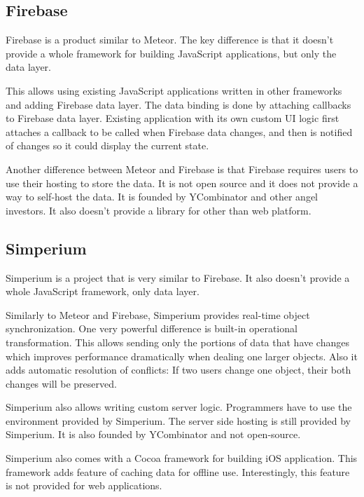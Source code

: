 \subsection{Firebase}

Firebase \citep{firebase} is a product similar to Meteor. The key difference is that it doesn't provide a whole framework for building JavaScript applications, but only the data layer.

This allows using existing JavaScript applications written in other frameworks and adding Firebase data layer. The data binding is done by attaching callbacks to Firebase data layer. Existing application with its own custom UI logic first attaches a callback to be called when Firebase data changes, and then is notified of changes so it could display the current state.

Another difference between Meteor and Firebase is that Firebase requires users to use their hosting to store the data. It is not open source and it does not provide a way to self-host the data. It is founded by YCombinator \citep{ycombinator} and other angel investors. It also doesn't provide a library for other than web platform.

\subsection{Simperium}

Simperium is a project that is very similar to Firebase. It also doesn't provide a whole JavaScript framework, only data layer.

Similarly to Meteor and Firebase, Simperium provides real-time object synchronization. One very powerful difference is built-in operational transformation. \citep{ot} This allows sending only the portions of data that have changes which improves performance dramatically when dealing one larger objects. Also it adds automatic resolution of conflicts: If two users change one object, their both changes will be preserved.

Simperium also allows writing custom server logic. Programmers have to use the environment provided by Simperium. The server side hosting is still provided by Simperium. It is also founded by YCombinator \citep{ycombinator} and not open-source. 

Simperium also comes with a Cocoa framework for building iOS application. This framework adds feature of caching data for offline use. Interestingly, this feature is not provided for web applications.

